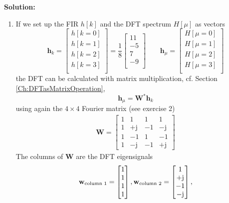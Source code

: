 \documentclass[11pt,a4paper,DIV=12]{scrartcl}
\begin{document}
\begin{Loesung}
\textbf{Solution:}
\begin{enumerate}[label=\alph*)]
	\item
  If we set up the FIR $h[k]$ and the DFT spectrum $H[\mu]$ as vectors
  \begin{equation}
  \mathbf{h}_k =
  \begin{bmatrix}
  h[k=0]\\
  h[k=1]\\
  h[k=2]\\
  h[k=3]\\
  \end{bmatrix}
  =
  \frac{1}{8}
  \begin{bmatrix}
  11\\
  -5\\
  7\\
  -9\\
  \end{bmatrix}
  \qquad
  \mathbf{h}_\mu =
  \begin{bmatrix}
  H[\mu=0]\\
  H[\mu=1]\\
  H[\mu=2]\\
  H[\mu=3]\\
  \end{bmatrix}
  \end{equation}
  the DFT can be calculated with matrix multiplication,
  cf. Section \ref{Ch:DFTasMatrixOperation},
  \begin{equation}
  \mathbf{h}_\mu = \mathbf{W}^* \mathbf{h}_k
  \end{equation}
  using again the $4 \times 4$ Fourier matrix (see exercise 2)
  \begin{align}
  \mathbf{W} = \begin{bmatrix}
  1 & 1 & 1 & 1\\
  1 & +\mathrm{j} & -1 & -\mathrm{j}\\
  1 & -1 & 1 & -1\\
  1 & -\mathrm{j} & -1 & +\mathrm{j}
  \end{bmatrix}
  \end{align}
  The columns of $\bm W$ are the DFT eigensignals
  \begin{align}
  \mathbf{w}_\text{column 1} = \begin{bmatrix}1\\1\\1\\1\end{bmatrix},
  \mathbf{w}_\text{column 2} = \begin{bmatrix}1\\+\im\\-1\\-\im\end{bmatrix},

\end{align}
\end{enumerate}
\end{Loesung}
\end{document}
